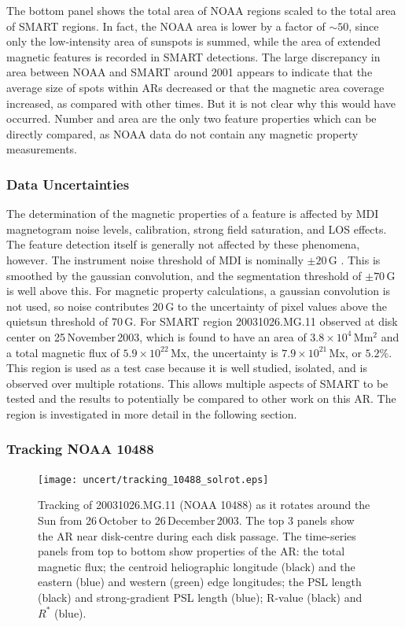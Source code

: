 The bottom panel shows the total area of \gls{NOAA} regions scaled to the total area of \gls{SMART} regions. In fact, the \gls{NOAA} area is lower by a factor of $\sim$$50$, since only the low-intensity area of sunspots is summed, while the area of extended magnetic features is recorded in \gls{SMART} detections. The large discrepancy in area between NOAA and SMART around 2001 appears to indicate that the average size of spots within ARs decreased or that the magnetic area coverage increased, as compared with other times. But it is not clear why this would have occurred. Number and area are the only two feature properties which can be directly compared, as \gls{NOAA} data do not contain any magnetic property measurements.


\subsubsection{Data Uncertainties}\label{sect:mdiuncert}

The determination of the magnetic properties of a feature is affected by MDI magnetogram noise levels, calibration, strong field saturation, and LOS effects. The feature detection itself is generally not affected by these phenomena, however. The instrument noise threshold of MDI is nominally $\pm$$20$\,G \citep{Scherrer:1995}. This is smoothed by the gaussian convolution, and the segmentation threshold of $\pm$$70$\,G is well above this. For magnetic property calculations, a gaussian convolution is not used, so noise contributes $20$\,G to the uncertainty of pixel values above the \gls{quietsun} threshold of $70$\,G. For \gls{SMART} region 20031026.MG.11 observed at disk center on 25\,November\,2003, which is found to have an area of $3.8\times10^{4}$\,Mm$^2$ and a total magnetic flux of $5.9\times10^{22}$\,Mx, the uncertainty is $7.9\times10^{21}$\,Mx, or $5.2\%$. This region is used as a test case because it is well studied, isolated, and is observed over multiple rotations. This allows multiple aspects of SMART to be tested and the results to potentially be compared to other work on this \gls{AR}. The region is investigated in more detail in the following section.


\subsubsection{Tracking NOAA 10488}\label{sect:trackstab}

\begin{figure}[!t]
\centerline{\texttt{[image: uncert/tracking\_10488\_solrot.eps]}}
\caption[Tracking of 20031026.MG.11.]{Tracking of 20031026.MG.11 (NOAA 10488) as it rotates around the Sun from 26\,October to 26\,December\,2003. The top 3 panels show the AR near disk-centre during each disk passage. The time-series panels from top to bottom show properties of the AR: the total magnetic flux; the centroid heliographic longitude (black) and the eastern (blue) and western (green) edge longitudes; the PSL length (black) and strong-gradient PSL length (blue); R-value (black) and $R^*$ (blue).}
\label{ar_track}
\end{figure}

